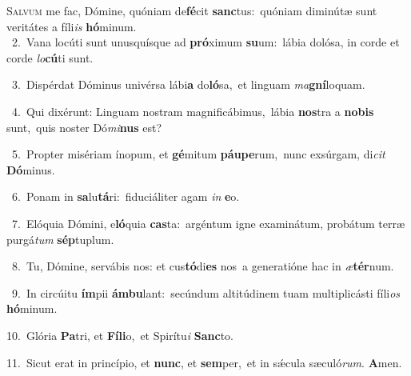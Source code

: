 \lettrine{\initial\textcolor{\initialcolor}{S}}{alvum} me fac, Dómine, quóniam de\-\textbf{fé}\-cit \textbf{sanc}\-tus:~\star quóniam diminútæ sunt veritátes a fíli\textit{is} \textbf{hó}\-minum.\\
{\numbfont\textcolor{\numbcolor}{~2.}}~Vana locúti sunt unusquísque ad \textbf{pró}\-ximum \textbf{su}\-um:~\star lábia dolósa, in corde et corde \textit{lo}\-\textbf{cú}ti sunt.\par
{\numbfont\textcolor{\numbcolor}{~3.}}~Dispérdat Dóminus univérsa lábi\textbf{a} do\-\textbf{ló}\-sa,~\star et linguam \textit{ma}\-\textbf{gní}loquam.\par
{\numbfont\textcolor{\numbcolor}{~4.}}~Qui dixérunt: Linguam nostram magnificábimus,~\dagger lábia \textbf{nos}\-tra a \textbf{no}\-\textbf{bis} sunt,~\star quis noster Dó\-\textit{mi}\-\textbf{nus} est?\par
{\numbfont\textcolor{\numbcolor}{~5.}}~Propter misériam ínopum, et \textbf{gé}\-mitum \textbf{páu}\-\textbf{pe}rum,~\star nunc exsúrgam, di\textit{cit} \textbf{Dó}\-minus.\par
{\numbfont\textcolor{\numbcolor}{~6.}}~Ponam in \textbf{sa}\-lu\-\textbf{tá}\-ri:~\star fiduciáliter agam \textit{in} \textbf{e}\-o.\par
{\numbfont\textcolor{\numbcolor}{~7.}}~Elóquia Dómini, e\-\textbf{ló}\-quia \textbf{cas}\-ta:~\star argéntum igne examinátum, probátum terræ purgá\textit{tum} \textbf{sép}\-tuplum.\par
{\numbfont\textcolor{\numbcolor}{~8.}}~Tu, Dómine, servábis nos: et cus\-\textbf{tó}\-di\textbf{es} nos~\star a generatióne hac in \textit{æ}\-\textbf{tér}num.\par
{\numbfont\textcolor{\numbcolor}{~9.}}~In circúitu \textbf{ím}\-pii \textbf{ám}\-\textbf{bu}lant:~\star secúndum altitúdinem tuam multiplicásti fíli\textit{os} \textbf{hó}\-minum.\par
{\numbfont\textcolor{\numbcolor}{10.}}~Glória \textbf{Pa}\-tri, et \textbf{Fí}\-\textbf{li}o,~\star et Spirítu\textit{i} \textbf{Sanc}\-to.\par
{\numbfont\textcolor{\numbcolor}{11.}}~Sicut erat in princípio, et \textbf{nunc}\-, et \textbf{sem}\-per,~\star et in sǽcula sæculó\-\textit{rum}\-. \textbf{A}\-men.\par
